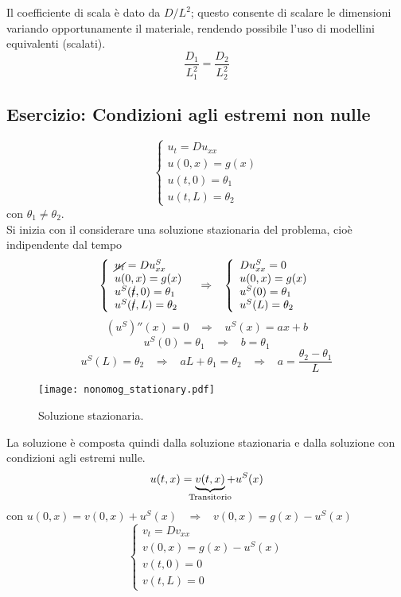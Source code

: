 Il coefficiente di scala \`e dato da $D/L^2$; questo consente di
scalare le dimensioni variando opportunamente il materiale, rendendo possibile
l'uso di modellini equivalenti (scalati).
\[
	\frac{D_1}{L_1^2}= \frac{D_2}{L_2^2}
\]
\subsection{Esercizio: Condizioni agli estremi non nulle}
\[
	\left\{
	\begin{array}{l}
		u_t=Du_{xx} \\
		u(0,x)=g(x) \\
		u(t,0)=\theta_1 \\
		u(t,L)=\theta_2
	\end{array}
	\right.
\]
con $\theta_1 \neq \theta_2$.\\
Si inizia con il considerare una soluzione stazionaria del problema, cio\`e
indipendente dal tempo
\[
	\left\{
	\begin{array}{l}
		\cancel{u_t}=Du_{xx}^S \\
		u(0,x)=g(x) \\
		u^S(\cancel{t},0)=\theta_1 \\
		u^S(\cancel{t},L)=\theta_2
	\end{array}
	\right.
	\;\;\;
	\Rightarrow
	\;\;\;
	\left\{
	\begin{array}{l}
		Du_{xx}^S= 0 \\
		u(0,x)=g(x) \\
		u^S(0)=\theta_1 \\
		u^S(L)=\theta_2
	\end{array}
	\right.
\]
\[
	(u^S)''(x)=0 \;\;\; \Rightarrow \;\;\; u^S(x)=ax+b
\]
\[
	u^S(0)= \theta_1 \;\;\; \Rightarrow \;\;\; b= \theta_1
\]
\[
	u^S(L)= \theta_2 \;\;\; \Rightarrow \;\;\; aL+\theta_1= \theta_2
	\;\;\; \Rightarrow \; \; \; a= \frac{\theta_2 - \theta_1}{L}
\]
\begin{figure}[H]
	\centering
	\texttt{[image: nonomog\_stationary.pdf]}
	\caption{Soluzione stazionaria.}
	\label{nonomog_stationary}
\end{figure}
La soluzione \`e composta quindi dalla soluzione stazionaria e dalla soluzione
con condizioni agli estremi nulle.
\[
	u(t,x)= \underbrace{v(t,x)}_{\mathclap{\text{Transitorio}}} + u^S(x)
\]
con $u(0,x)= v(0,x) + u^S(x) \;\;\; \Rightarrow \;\;\; v(0,x)=g(x)- u^S(x)$
\[
	\left\{
	\begin{array}{l}
		v_t=Dv_{xx} \\
		v(0,x)=g(x)- u^S(x) \\
		v(t,0)=0 \\
		v(t,L)=0
	\end{array}
	\right.
\]
